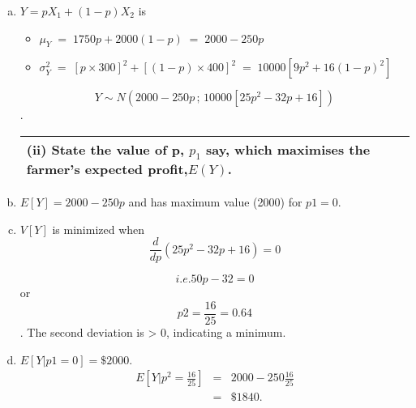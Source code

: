 \documentclass[a4paper,12pt]{article}
\begin{document}
\begin{enumerate}[(a)]
\item $Y = pX_1 + (1 - p)X_2$ is

\begin{itemize}
    \item $\mu_Y \;=\; 1750p + 2000(1 - p) \;=\; 2000 - 250p$
    \item $\sigma^2_Y \;=\; [p \times 300]^2 + [(1 - p) \times 400]^2 \;=\; 10000 \left[9p^2 + 16(1 - p)^2\right]$
\end{itemize}


\[ Y \sim N \left(2000 - 250p \,;\, 10000\left[25p^2 - 32p + 16\right] \right)\].


\newpage
  \begin{table}[ht!]
     \centering
     \begin{tabular}{|p{15cm}|}
     \hline  
(ii) State the value of p, $p_1$ say, which maximises the farmer’s expected profit,$E(Y)$. 
\\ \hline 
      \end{tabular}
    \end{table}
    
    
\item $E[Y ] = 2000 - 250p$ and has maximum value (2000) for $p1 = 0$.
\item $V[Y]$ is minimized when 
\[ \frac{d}{dp}(25p^2 - 32p + 16) =0\]

\[i.e. 50p - 32 = 0\] or \[p2 = \frac{16}{25}=0.64\].
The second deviation is > 0, indicating a minimum.
\item  $E[Y |p1 = 0] = \$2000$. 
\begin{eqnarray*}
E\left[Y | p^2 = \frac{16}{25}\right] &=& 2000 - 250 \frac{16}{25}\\ 
&=& \$1840.
\end{eqnarray*}


\newpage
  \begin{table}[ht!]
     \centering
     \begin{tabular}{|p{15cm}|}
     \hline  


\end{tabular}
\end{table}
\end{enumerate}
\end{document}
